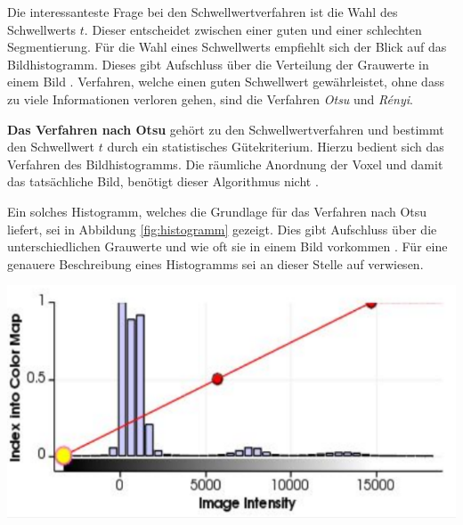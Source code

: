 Die interessanteste Frage bei den Schwellwertverfahren ist die Wahl des Schwellwerts
$t$. Dieser entscheidet zwischen einer guten und einer schlechten Segmentierung.
Für die Wahl eines Schwellwerts empfiehlt sich der Blick auf das Bildhistogramm.
Dieses gibt Aufschluss über die Verteilung der Grauwerte in einem Bild \citep[vgl.][S.~361]{lehmann2013bildverarbeitung}.
Verfahren, welche einen guten Schwellwert gewährleistet, ohne dass zu viele
Informationen verloren gehen, sind die Verfahren \textit{Otsu} und \textit{Rényi}.

\pagebreak

\textbf{Das Verfahren nach Otsu} gehört zu den Schwellwertverfahren und bestimmt
den Schwellwert $t$ durch ein statistisches Gütekriterium. Hierzu bedient sich
das Verfahren des Bildhistogramms. Die räumliche Anordnung der Voxel und damit das
tatsächliche Bild, benötigt dieser Algorithmus nicht \citep[vgl.][S.~264]{lehmann2013bildverarbeitung}.

\begin{minipage}{0.40\textwidth}
	Ein solches Histogramm, welches die Grundlage für das Verfahren nach Otsu
	liefert, sei in Abbildung \ref{fig:histogramm} gezeigt. Dies gibt Aufschluss
	über die unterschiedlichen Grauwerte und wie oft sie in einem Bild vorkommen
	\citep[vgl.][S.~264]{lehmann2013bildverarbeitung}. Für eine genauere
	Beschreibung eines Histogramms sei an dieser Stelle auf \citet[S.~42]{burger2009}
	verwiesen.
\end{minipage}
\hfill
\begin{minipage}{0.50\textwidth}
	\centering
	\includegraphics[width=1\textwidth]{img/histogramm.jpg}
	\label{fig:histogramm}
\end{minipage}

